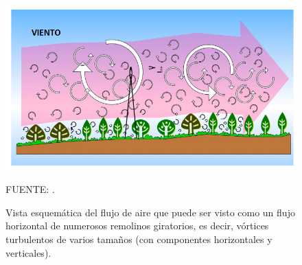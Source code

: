 \begin{figure}[ht!]
\centering
	\includegraphics[scale=0.77]{Images/wang01.png}
	\caption{Vista esquemática del flujo de aire que puede ser visto como un flujo horizontal de numerosos remolinos giratorios, es decir, vórtices turbulentos de varios tamaños (con componentes horizontales y verticales).}
	{\raggedright FUENTE: \citet{wang2012review}.	 \par}

	\label{fig:wang01}
\end{figure}